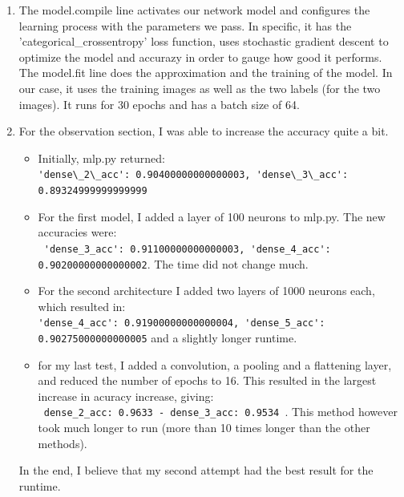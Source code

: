 \documentclass[letterpaper, 12pt]{article}
\begin{document}
\begin{enumerate}
\item  The model.compile line activates our network model and configures the learning process with the parameters we pass. In specific, it has the 'categorical\_crossentropy' loss function, uses stochastic gradient descent to optimize the model and accurazy in order to gauge how good it performs.  \\
    The model.fit line does the approximation and the training of the model. In our case, it uses the training images as well as the two labels (for the two images). It runs for 30 epochs and has a batch size of 64.
        \item For the observation section, I was able to increase the accuracy quite a bit.
        \begin{itemize}
            
        
        \item Initially, mlp.py returned: \\ \verb|'dense\_2\_acc': 0.90400000000000003, 'dense\_3\_acc': 0.89324999999999999|
        \item  For the first model, I added a layer of 100 neurons to mlp.py. The new accuracies were: \\ \verb| 'dense_3_acc': 0.91100000000000003, 'dense_4_acc': 0.90200000000000002|. The time did not change much.
        \item For the second architecture I added two layers of 1000 neurons each, which resulted in: \\ \verb|'dense_4_acc': 0.91900000000000004, 'dense_5_acc': 0.90275000000000005| and a slightly longer runtime.
        \item for my last test, I added a convolution, a pooling and a flattening layer, and reduced the number of epochs to 16. This resulted in the largest increase in acuracy increase, giving: \\ \verb| dense_2_acc: 0.9633 - dense_3_acc: 0.9534 |. This method however took much longer to run (more than 10 times longer than the other methods).
        \end{itemize}
        In the end, I believe that my second attempt had the best result for the runtime.

\end{enumerate}
\end{document}
